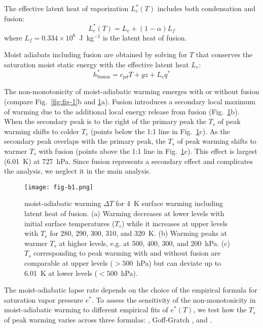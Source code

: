 \documentclass[draft]{ametsocV6.1}
\begin{document}
The effective latent heat of vaporization $L_e^*(T)$ includes both condensation and fusion:
\begin{equation}
L_e^*(T) = L_v + (1-\alpha) L_f
\end{equation}
where $L_f = 0.334 \times 10^6$~J~kg$^{-1}$ is the latent heat of fusion.

Moist adiabats including fusion are obtained by solving for $T$ that conserves the saturation moist static energy with the effective latent heat $L_e$:
\begin{equation}
    h_\mathrm{fusion}^* = c_{pd}T + gz + L_e q^*  \label{eq:mse_fusion}
\end{equation}

The non-monotonicity of moist-adiabatic warming emerges with or without fusion (compare Fig.~\ref{fig:fig-1}b and \ref{fig:fig-b1}a). Fusion introduces a secondary local maximum of warming due to the additional local energy release from fusion (Fig.~\ref{fig:fig-b1}b). When the secondary peak is to the right of the primary peak the $T_s$ of peak warming shifts to colder $T_s$ (points below the 1:1 line in Fig.~\ref{fig:fig-b1}c). As the secondary peak overlaps with the primary peak, the $T_s$ of peak warming shifts to warmer $T_s$ with fusion (points above the 1:1 line in Fig.~\ref{fig:fig-b1}c). This effect is largest (6.01~K) at 727~hPa. Since fusion represents a secondary effect and complicates the analysis, we neglect it in the main analysis.

\begin{figure}[htbp]
 \centering
 \texttt{[image: fig-b1.png]}
 \caption{moist-adiabatic warming $\Delta T$ for 4~K surface warming including latent heat of fusion. (a) Warming decreases at lower levels with initial surface temperatures ($T_s$) while it increases at upper levels with $T_s$ for 280, 290, 300, 310, and 320~K. (b) Warming peaks at warmer $T_s$ at higher levels, e.g. at 500, 400, 300, and 200~hPa. (c) $T_s$ corresponding to peak warming with and without fusion are comparable at upper levels ($>500$~hPa) but can deviate up to 6.01~K at lower levels ($<500$~hPa).}\label{fig:fig-b1}
\end{figure}

\appendix[C] 
\label{app:svp}
The moist-adiabatic lapse rate depends on the choice of the empirical formula for saturation vapor pressure $e^*$. To assess the sensitivity of the non-monotonicity in moist-adiabatic warming to different empirical fits of $e^*(T)$, we test how the $T_s$ of peak warming varies across three formulas: \cite{bolton1980}, Goff-Gratch \citep[as described in][]{list1949}, and \cite{murphy2005}.
\end{document}
